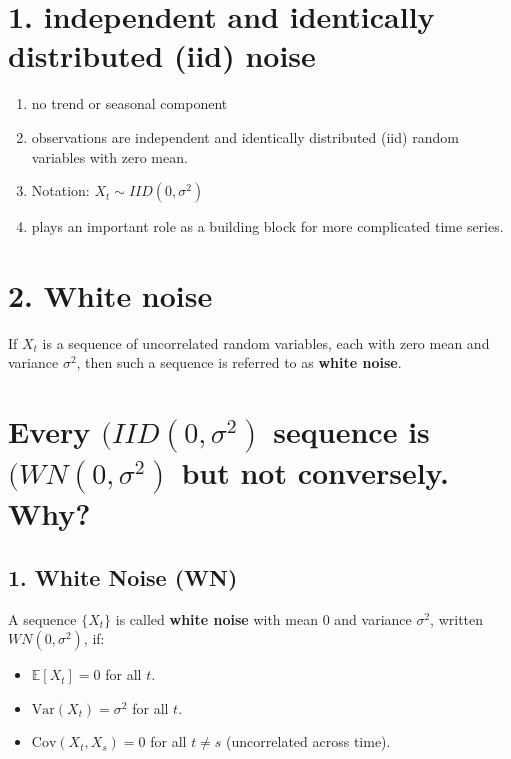 \documentclass[
  11pt,
  a4paper,
]{report}
\providecommand{\tightlist}{%
  \setlength{\itemsep}{0pt}\setlength{\parskip}{0pt}}\usepackage{longtable,booktabs,array}
\begin{document}
\section{1. independent and identically distributed (iid)
noise}\label{independent-and-identically-distributed-iid-noise}

\begin{enumerate}
\def\labelenumi{\arabic{enumi}.}
\item
  no trend or seasonal component
\item
  observations are independent and identically distributed (iid) random
  variables with zero mean.
\item
  Notation: \({X_t} \sim IID(0, \sigma^2)\)
\item
  plays an important role as a building block for more complicated time
  series.
\end{enumerate}

\section{2. White noise}\label{white-noise}

If \({X_t}\) is a sequence of uncorrelated random variables, each with
zero mean and variance \(\sigma^2\), then such a sequence is referred to
as \textbf{white noise}.

\section{\texorpdfstring{Every \((IID(0, \sigma^2)\) sequence is
\((WN(0, \sigma^2)\) but not conversely.
Why?}{Every (IID(0, \textbackslash sigma\^{}2) sequence is (WN(0, \textbackslash sigma\^{}2) but not conversely. Why?}}\label{every-iid0-sigma2-sequence-is-wn0-sigma2-but-not-conversely.-why}

\subsection{1. White Noise (WN)}\label{white-noise-wn}

A sequence \(\{X_t\}\) is called \textbf{white noise} with mean \(0\)
and variance \(\sigma^2\), written \(WN(0, \sigma^2)\), if:

\begin{itemize}
\tightlist
\item
  \(\mathbb{E}[X_t] = 0\) for all \(t\).\\
\item
  \(\mathrm{Var}(X_t) = \sigma^2\) for all \(t\).\\
\item
  \(\mathrm{Cov}(X_t, X_s) = 0\) for all \(t \neq s\) (uncorrelated
  across time).
\end{itemize}
\end{document}
